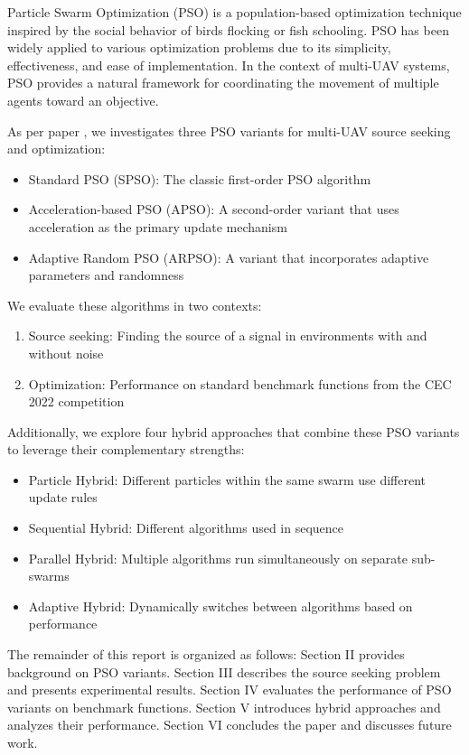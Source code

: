 \documentclass[conference]{IEEEtran}
\begin{document}
Particle Swarm Optimization (PSO) is a population-based optimization technique inspired by the social behavior of birds flocking or fish schooling. PSO has been widely applied to various optimization problems due to its simplicity, effectiveness, and ease of implementation. In the context of multi-UAV systems, PSO provides a natural framework for coordinating the movement of multiple agents toward an objective.

As per paper \cite{10312321}, we investigates three PSO variants for multi-UAV source seeking and optimization:
\begin{itemize}
    \item Standard PSO (SPSO): The classic first-order PSO algorithm
    \item Acceleration-based PSO (APSO): A second-order variant that uses acceleration as the primary update mechanism
    \item Adaptive Random PSO (ARPSO): A variant that incorporates adaptive parameters and randomness
\end{itemize}

We evaluate these algorithms in two contexts:
\begin{enumerate}
    \item Source seeking: Finding the source of a signal in environments with and without noise
    \item Optimization: Performance on standard benchmark functions from the CEC 2022 competition
\end{enumerate}

Additionally, we explore four hybrid approaches that combine these PSO variants to leverage their complementary strengths:
\begin{itemize}
    \item Particle Hybrid: Different particles within the same swarm use different update rules
    \item Sequential Hybrid: Different algorithms used in sequence
    \item Parallel Hybrid: Multiple algorithms run simultaneously on separate sub-swarms
    \item Adaptive Hybrid: Dynamically switches between algorithms based on performance
\end{itemize}

The remainder of this report is organized as follows: Section II provides background on PSO variants. Section III describes the source seeking problem and presents experimental results. Section IV evaluates the performance of PSO variants on benchmark functions. Section V introduces hybrid approaches and analyzes their performance. Section VI concludes the paper and discusses future work.
\end{document}

